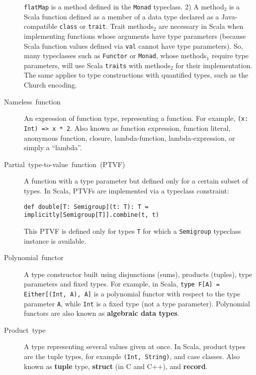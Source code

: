 \begin{description}
\lstinline!flatMap! is a method defined in the \lstinline!Monad!
typeclass. 2) A method$_{2}$ is a Scala function defined as a member
of a data type declared as a Java-compatible \lstinline!class! or
\lstinline!trait!. Trait methods$_{2}$ are necessary in Scala when
implementing functions whose arguments have type parameters (because
Scala function values defined via \lstinline!val! cannot have type
parameters). So, many typeclasses such as \lstinline!Functor! or
\lstinline!Monad!, whose methods$_{1}$ require type parameters,
will use Scala \lstinline!traits! with methods$_{2}$ for their implementation.
The same applies to type constructions with quantified types, such
as the Church encoding. 
\item [{Nameless~function}] An expression of
function type, representing a function. For example, \lstinline!(x: Int) => x * 2!.
Also known as function expression, function literal, anonymous function,
closure, lambda-function,
lambda-expression, or simply a \textsf{``}lambda\textsf{''}.
\item [{Partial~type-to-value~function~(PTVF)}] A function with a type
parameter but defined only for a certain subset of types.
In Scala, PTVFs are implemented via a typeclass constraint:
\begin{lstlisting}
def double[T: Semigroup](t: T): T = implicitly[Semigroup[T]].combine(t, t)
\end{lstlisting}
This PTVF is defined only for types \lstinline!T! for which a \lstinline!Semigroup!
typeclass instance is available.
\item [{Polynomial~functor}] A type constructor
built using disjunctions (sums), products (tuples), type parameters
and fixed types. For example, in Scala, \lstinline!type F[A] = Either[(Int, A), A]!
is a polynomial functor with respect to the type parameter \lstinline!A!,
while \lstinline!Int! is a fixed type (not a type parameter). Polynomial
functors are also known as \textbf{algebraic data types}.
\item [{Product~type}] A type representing several
values given at once. In Scala, product types are the tuple types,
for example \lstinline!(Int, String)!, and case classes. Also known
as \textbf{tuple} type, \textbf{struct} (in C and C++),
and \textbf{record}.

\end{description}
